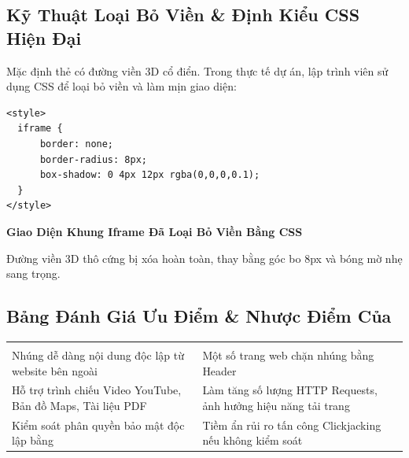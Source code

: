 \subsection{Kỹ Thuật Loại Bỏ Viền \& Định Kiểu CSS Hiện Đại}

Mặc định thẻ  có đường viền 3D cổ điển. Trong thực tế dự án, lập trình viên sử dụng CSS để loại bỏ viền và làm mịn giao diện:

\begin{codeWindow}
\begin{lstlisting}[language=HTML5]
<style>
  iframe {
      border: none;
      border-radius: 8px;
      box-shadow: 0 4px 12px rgba(0,0,0,0.1);
  }
</style>
\end{lstlisting}
\end{codeWindow}

\begin{browserWindow}[https://example.com (style="border: none; border-radius: 8px;")]
\centering\sffamily\vspace{4pt}
{\bfseries\color{tipBorder}\large Giao Diện Khung Iframe Đã Loại Bỏ Viền Bằng CSS} \par\vspace{6pt}
\small\color{darkText} Đường viền 3D thô cứng bị xóa hoàn toàn, thay bằng góc bo 8px và bóng mờ nhẹ sang trọng. \par\vspace{4pt}
\end{browserWindow}

\subsection{Bảng Đánh Giá Ưu Điểm \& Nhược Điểm Của }

\begin{prettyTableBox}
\begin{tabularx}{\linewidth}{Z Z}
 &  \\
Nhúng dễ dàng nội dung độc lập từ website bên ngoài & Một số trang web chặn nhúng bằng Header  \\
Hỗ trợ trình chiếu Video YouTube, Bản đồ Maps, Tài liệu PDF & Làm tăng số lượng HTTP Requests, ảnh hưởng hiệu năng tải trang \\
Kiểm soát phân quyền bảo mật độc lập bằng  & Tiềm ẩn rủi ro tấn công Clickjacking nếu không kiểm soát \\
\end{tabularx}
\end{prettyTableBox}

